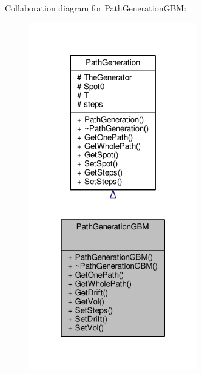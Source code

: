 Collaboration diagram for Path\+Generation\+G\+BM\+:
\nopagebreak
\begin{figure}[H]
\begin{center}
\leavevmode
\includegraphics[width=208pt]{classPathGenerationGBM__coll__graph}
\end{center}
\end{figure}
